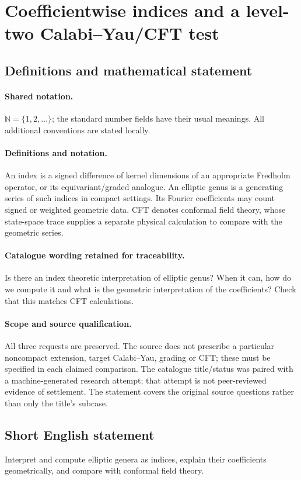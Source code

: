 \documentclass[11pt]{article}
\begin{document}
\section{Coefficientwise indices and a level-two Calabi--Yau/CFT test}\label{statement}

\subsection{Definitions and mathematical statement}

\paragraph{Shared notation.}$\mathbb N=\{1,2,\ldots\}$; the standard number fields have their usual meanings. All additional conventions are stated locally.


\paragraph{Definitions and notation.}An index is a signed difference of kernel dimensions of an appropriate Fredholm operator, or its equivariant/graded analogue. An elliptic genus is a generating series of such indices in compact settings. Its Fourier coefficients may count signed or weighted geometric data. CFT denotes conformal field theory, whose state-space trace supplies a separate physical calculation to compare with the geometric series.

\paragraph{Catalogue wording retained for traceability.}
Is there an index theoretic interpretation of elliptic genus? When it can, how do we compute it and what is the geometric interpretation of the coefficients? Check that this matches CFT calculations.
\paragraph{Scope and source qualification.}All three requests are preserved. The source does not prescribe a particular noncompact extension, target Calabi--Yau, grading or CFT; these must be specified in each claimed comparison. The catalogue title/status was paired with a machine-generated research attempt; that attempt is not peer-reviewed evidence of settlement. The statement covers the original source questions rather than only the title’s subcase.
\subsection{Short English statement}
Interpret and compute elliptic genera as indices, explain their coefficients geometrically, and compare with conformal field theory.
\end{document}

